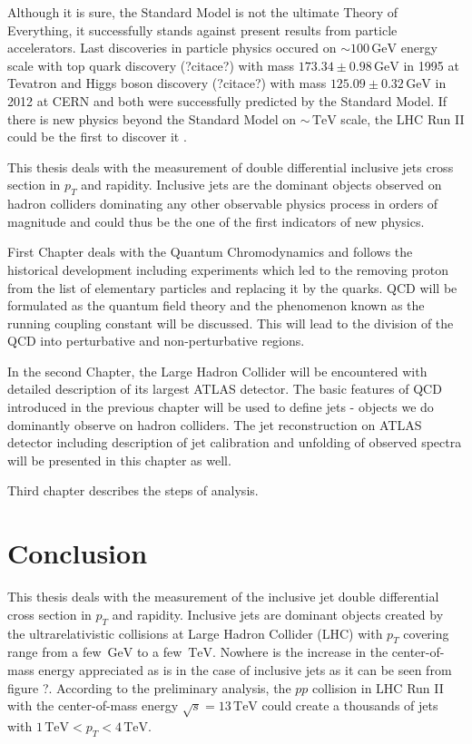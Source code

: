 \documentclass[a4paper,11pt,twoside,openright]{book}
\newcommand{\TeV}{\,\text{TeV}}
\newcommand{\GeV}{\,\text{GeV}}
\newcommand{\pt}{p_{T}}
\begin{document}
Although it is sure, the Standard Model is not the ultimate Theory of
Everything, it successfully stands against present results from particle
accelerators. 
Last discoveries in particle physics occured on $\sim 100\GeV$ energy
scale with top quark discovery (?citace?) with mass $173.34 \pm 0.98 \GeV$ in 1995
at Tevatron and Higgs boson discovery (?citace?) with mass $125.09 \pm 0.32
\GeV$ in 2012 at CERN and both were successfully predicted by the Standard
Model. If there is new physics beyond the Standard Model on $\sim \TeV$ scale,
the LHC Run II could be the first to discover it \cite{PhysicsAtRun2LHC}. 

This thesis deals with the measurement of double differential inclusive jets 
cross section in $\pt$ and rapidity.  Inclusive jets are the dominant objects
observed on hadron colliders dominating any other observable physics process in
orders of magnitude and could thus be the one of the first indicators of new
physics. 

First Chapter deals with the Quantum Chromodynamics and follows the historical
development including experiments which led to the removing proton from the list
of elementary particles and replacing it by the quarks. QCD will be formulated
as the quantum field theory and the phenomenon known as the running coupling
constant will be discussed. This will lead to the division of the QCD into
perturbative and non-perturbative regions.

In the second Chapter, the Large Hadron Collider will be encountered with
detailed description of its largest ATLAS detector. The basic features of QCD
introduced in the previous chapter will be used to define jets - objects we do
dominantly observe on hadron colliders. The jet reconstruction on ATLAS detector
including description of jet calibration and unfolding of observed spectra will
be presented in this chapter as well.

Third chapter describes the steps of analysis.






\chapter*{Conclusion}

This thesis deals with the measurement of the inclusive jet double differential
cross section in $\pt$ and rapidity. Inclusive jets are dominant objects created
by the ultrarelativistic collisions at Large Hadron Collider (LHC) with $\pt$
covering range from a few $\GeV$ to a few $\TeV$. Nowhere is the increase in the
center-of-mass energy appreciated as is in the case of inclusive jets as it can
be seen from figure ?.  According to the preliminary analysis, the $pp$
collision in LHC Run II with the center-of-mass energy $\sqrt{s} = 13\TeV$ could
create a thousands of jets with $1\TeV < \pt < 4\TeV$.
\end{document}
